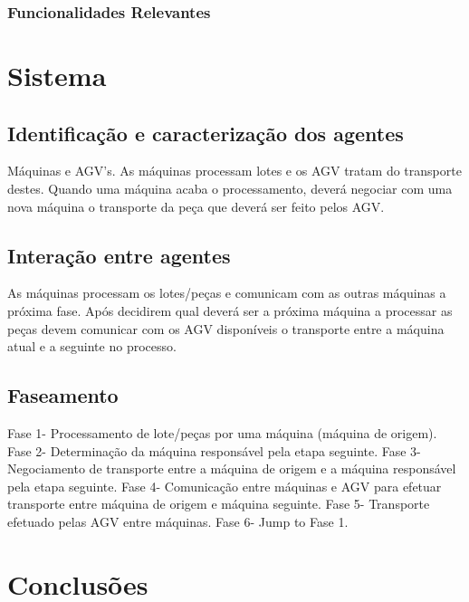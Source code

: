 \begin{titlepage}
\subsubsection{Funcionalidades Relevantes}



\section{Sistema}

\subsection{Identificação e caracterização dos agentes}
Máquinas e AGV's. As máquinas processam lotes e os AGV tratam do transporte destes. Quando uma máquina acaba o processamento, deverá negociar com uma nova máquina o transporte da peça que deverá ser feito pelos AGV.

\subsection{Interação entre agentes}
As máquinas processam os lotes/peças e comunicam com as outras máquinas a próxima fase. Após decidirem qual deverá ser a próxima máquina a processar as peças devem comunicar com os AGV disponíveis o transporte entre a máquina atual e a seguinte no processo.

\subsection{Faseamento}
Fase 1- Processamento de lote/peças por uma máquina (máquina de origem).
\newline
Fase 2- Determinação da máquina responsável pela etapa seguinte.
\newline
Fase 3- Negociamento de transporte entre a máquina de origem e a máquina responsável pela etapa seguinte.
\newline
Fase 4- Comunicação entre máquinas e AGV para efetuar transporte entre máquina de origem e máquina seguinte.
\newline
Fase 5- Transporte efetuado pelas AGV entre máquinas.
\newline
Fase 6- Jump to Fase 1.



\section{Conclusões}
\justify\normalsize





\end{titlepage}
